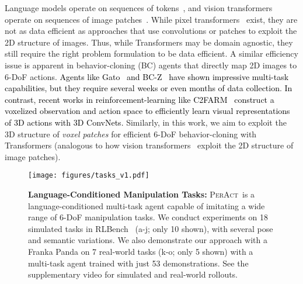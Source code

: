 \documentclass{article}
\newcommand{\highlight}[1]{\textcolor{black}{#1}}
\newcommand{\model}{\textsc{PerAct}}
\begin{document}
Language models operate on sequences of tokens~\citep{devlin2018bert}, and vision transformers operate on sequences of image patches~\citep{dosovitskiy2020image}. While pixel transformers~\citep{jaegle2021perceivericml,jaegle2021perceiver} exist, they are not as data efficient as approaches that use convolutions or patches to exploit the 2D structure of images. Thus, while Transformers may be domain agnostic, they still require the right problem formulation to be data efficient. 
A similar efficiency issue is apparent in behavior-cloning (BC) agents that directly map 2D images to 6-DoF actions.
\highlight{Agents like Gato~\citep{reed2022generalist} and BC-Z~\citep{jang2022bc,ahn2022can} have shown impressive multi-task capabilities, but they require several weeks or even months of data collection}.
\highlight{In contrast, recent works in reinforcement-learning like C2FARM~\citep{c2farm} construct a voxelized  observation and action space to efficiently learn visual representations of 3D actions with 3D ConvNets.}  
Similarly, in this work, we aim to exploit the 3D structure of \textit{voxel patches} for efficient 6-DoF behavior-cloning with Transformers (analogous to how vision transformers~\citep{dosovitskiy2020image} exploit the 2D structure of image patches).




\begin{figure*}[!t]
    \centering
    \hspace*{-1.45cm}
    \texttt{[image: figures/tasks\_v1.pdf]}
    \caption{\textbf{Language-Conditioned Manipulation  Tasks:} \model~is a language-conditioned multi-task agent capable of imitating a wide range of 6-DoF manipulation tasks. We conduct experiments on 18 simulated tasks in RLBench~\citep{james2020rlbench} (a-j; only 10 shown), with several pose and semantic variations. We also demonstrate our approach with a Franka Panda on 7 real-world tasks (k-o; only 5 shown) with a multi-task agent trained with just 53 demonstrations. See the supplementary video for simulated and real-world rollouts.}
    \label{fig:tasks}
    \vspace{-1.5em}
\end{figure*}
\end{document}
